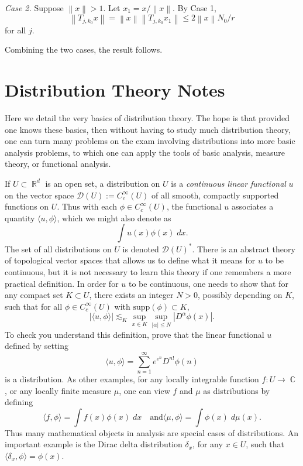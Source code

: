 \documentclass[answers]{exam}
\DeclareMathOperator{\CC}{\mathbb{C}}
\DeclareMathOperator{\RR}{\mathbb{R}}
\theoremstyle{problemstyle}
\newcommand{\norm}[1]{\left\lVert#1\right\rVert} %
\newcommand{\1}[1]{\textbf{1}_{\left[#1\right]}} %
\begin{document}
\begin{questions}
\begin{solution}
\textit{Case 2.} Suppose $\norm{x}>1$. Let $x_1 = x/\norm{x}$. By Case 1,
\begin{equation*}
\norm{T_{j,k_0} x} = \norm{x} \norm{T_{j,k_0}x_1} \leq 2\norm{x}N_0/r
\end{equation*}
for all $j$. 

Combining the two cases, the result follows.
\end{solution}







\newpage
\section{Distribution Theory Notes}

Here we detail the very basics of distribution theory. The hope is that provided one knows these basics, then without having to study much distribution theory, one can turn many problems on the exam involving distributions into more basic analysis problems, to which one can apply the tools of basic analysis, measure theory, or functional analysis.

If $U \subset \RR^d$ is an open set, a distribution on $U$ is a \emph{continuous linear functional} $u$ on the vector space $\mathcal{D}(U) := C_c^\infty(U)$ of all smooth, compactly supported functions on $U$. Thus with each $\phi \in C_c^\infty(U)$, the functional $u$ associates a quantity $\langle u, \phi \rangle$, which we might also denote as
%
\[ \int u(x) \phi(x)\; dx. \]
%
The set of all distributions on $U$ is denoted $\mathcal{D}(U)^*$. There is an abstract theory of topological vector spaces that allows us to define what it means for $u$ to be continuous, but it is not necessary to learn this theory if one remembers a more practical definition. In order for $u$ to be continuous, one needs to show that for any compact set $K \subset U$, there exists an integer $N > 0$, possibly depending on $K$, such that for all $\phi \in C_c^\infty(U)$ with $\text{supp}(\phi) \subset K$,
%
\[ |\langle u, \phi \rangle| \lesssim_K \sup_{x \in K} \sup_{|\alpha| \leq N} |D^\alpha \phi(x)|. \]
%
To check you understand this definition, prove that the linear functional $u$ defined by setting
%
\[ \langle u, \phi \rangle = \sum_{n = 1}^\infty e^{e^{n}} D^{n!} \phi(n) \]
%
is a distribution. As other examples, for any locally integrable function $f: U \to \CC$, or any locally finite measure $\mu$, one can view $f$ and $\mu$ as distributions by defining
%
\[ \langle f, \phi \rangle = \int f(x) \phi(x)\; dx \quad\text{and} \langle \mu, \phi \rangle = \int \phi(x)\; d\mu(x). \]
%
Thus many mathematical objects in analysis are special cases of distributions. An important example is the Dirac delta distribution $\delta_x$, for any $x \in U$, such that $\langle \delta_x, \phi \rangle = \phi(x)$.


\end{questions}
\end{document}
